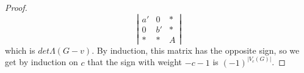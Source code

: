 \documentclass[10pt,a4paper]{amsart}
\begin{document}
\begin{proof}
$$\left|\begin{array}{ccc}  a' & 0 & \ast \\ 0 & b' & \ast \\ \ast & \ast & A\end{array}\right|$$
which is $det \Lambda(G-v)$. By induction, this matrix has the opposite sign, so we get by induction on $c$ that the sign with weight $-c-1$ is $(-1)^{|V_c(G)|}$. 
\end{proof}
\end{document}
